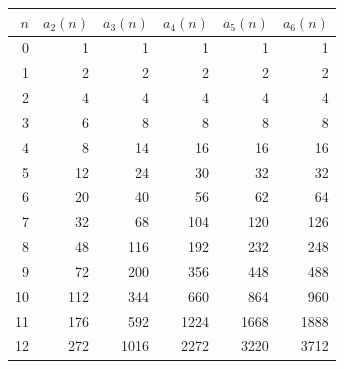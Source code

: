 \begin{center}
\begin{tabular}{@{}rrrrrr@{}}
\toprule
$n$ & $a_2(n)$ & $a_3(n)$ & $a_4(n)$ & $a_5(n)$ & $a_6(n)$\\
\midrule
0 & 1 & 1 & 1 & 1 & 1\\
1 & 2 & 2 & 2 & 2 & 2\\
2 & 4 & 4 & 4 & 4 & 4\\
3 & 6 & 8 & 8 & 8 & 8\\
4 & 8 & 14 & 16 & 16 & 16\\
5 & 12 & 24 & 30 & 32 & 32\\
6 & 20 & 40 & 56 & 62 & 64\\
7 & 32 & 68 & 104 & 120 & 126\\
8 & 48 & 116 & 192 & 232 & 248\\
9 & 72 & 200 & 356 & 448 & 488\\
10 & 112 & 344 & 660 & 864 & 960\\
11 & 176 & 592 & 1224 & 1668 & 1888\\
12 & 272 & 1016 & 2272 & 3220 & 3712\\
\bottomrule
\end{tabular}
\end{center}
